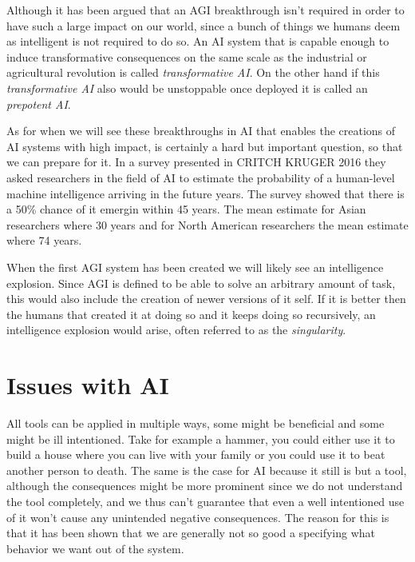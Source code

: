 \documentclass[12pt,A4]{report}
\theoremstyle{definition}
\begin{document}
Although it has been argued that an AGI breakthrough isn't required in order to have such a large impact on our world, since a bunch of things we humans deem as intelligent is not required to do so. An AI system that is capable enough to induce transformative consequences on the same scale as the industrial or agricultural revolution is called \textit{transformative AI}. On the other hand if this \textit{transformative AI} also would be unstoppable once deployed it is called an \textit{prepotent AI}. 

As for when we will see these breakthroughs in AI that enables the creations of AI systems with high impact, is certainly a hard but important question, so that we can prepare for it. In a survey presented in CRITCH KRUGER 2016 they asked researchers in the field of AI to estimate the probability of a human-level machine intelligence arriving in the future years. The survey showed that there is a 50\% chance of it emergin within 45 years. The mean estimate for Asian researchers where 30 years and for North American researchers the mean estimate where 74 years. %

When the first AGI system has been created we will likely see an intelligence explosion. Since AGI is defined to be able to solve an arbitrary amount of task, this would also include the creation of newer versions of it self. If it is better then the humans that created it at doing so and it keeps doing so recursively, an intelligence explosion would arise, often referred to as the \textit{singularity}.

\section{Issues with AI}
All tools can be applied in multiple ways, some might be beneficial and some might be ill intentioned. Take for example a hammer, you could either use it to build a house where you can live with your family or you could use it to beat another person to death. The same is the case for AI because it still is but a tool, although the consequences might be more prominent since we do not understand the tool completely, and we thus can't guarantee that even a well intentioned use of it won't cause any unintended negative consequences. The reason for this is that it has been shown that we are generally not so good a specifying what behavior we want out of the system.
\end{document}
